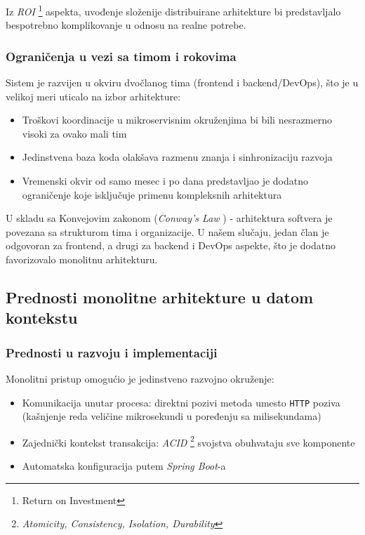 \documentclass[12pt]{article}
\begin{document}
    Iz \textit{ROI} \footnote{Return on Investment} aspekta, uvođenje složenije distribuirane arhitekture bi predstavljalo 
    bespotrebno komplikovanje u odnosu na realne potrebe.

    \subsubsection*{Ograničenja u vezi sa timom i rokovima}

    Sistem je razvijen u okviru dvočlanog tima (frontend i backend/DevOps), što je u velikoj meri uticalo na izbor arhitekture:
    \begin{itemize}
    \item Troškovi koordinacije u mikroservisnim okruženjima bi bili nesrazmerno visoki za ovako mali tim
    \item Jedinstvena baza koda olakšava razmenu znanja i sinhronizaciju razvoja
    \item Vremenski okvir od samo mesec i po dana predstavljao je dodatno ograničenje koje isključuje primenu kompleksnih arhitektura
    \end{itemize}

    U skladu sa Konvejovim zakonom (\textit{Conway's Law} \cite{ConwaysLaw}) - arhitektura softvera je povezana sa strukturom tima i organizacije.
    U našem slučaju, jedan član je odgovoran za frontend, a drugi za backend i DevOps aspekte, što je dodatno favorizovalo monolitnu arhitekturu.

    \newpage

    \subsection{Prednosti monolitne arhitekture u datom kontekstu}

    \subsubsection*{Prednosti u razvoju i implementaciji}

    Monolitni pristup omogućio je jedinstveno razvojno okruženje:
    \begin{itemize}
    \item Komunikacija unutar procesa: direktni pozivi metoda umesto \texttt{HTTP} poziva (kašnjenje reda veličine mikrosekundi u poređenju sa milisekundama)
    \item Zajednički kontekst transakcija: \textit{ACID} \footnote{\textit{Atomicity, Consistency, Isolation, Durability}} svojstva obuhvataju sve komponente
    \item Automatska konfiguracija putem \textit{Spring Boot}-a
    \end{itemize}
\end{document}
